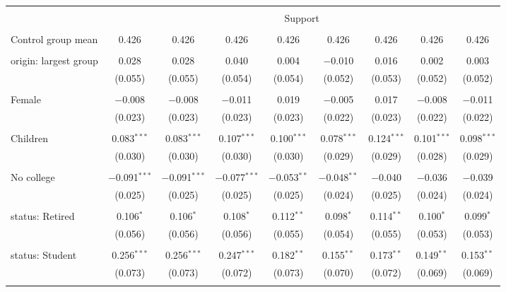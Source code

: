 
\begin{tabular}{@{\extracolsep{5pt}}lcccccccc} 
\\[-1.8ex]\hline 
\hline \\[-1.8ex] 
 & \multicolumn{8}{c}{Support} \\ 
\cline{2-9} 
\hline \\[-1.8ex] 
 Control group mean & 0.426 & 0.426 & 0.426 & 0.426 & 0.426 & 0.426 & 0.426 & 0.426  \\ \hline \\[-1.8ex] origin: largest group & 0.028 & 0.028 & 0.040 & 0.004 & $-$0.010 & 0.016 & 0.002 & 0.003 \\ 
  & (0.055) & (0.055) & (0.054) & (0.054) & (0.052) & (0.053) & (0.052) & (0.052) \\ 
  & & & & & & & & \\ 
 Female & $-$0.008 & $-$0.008 & $-$0.011 & 0.019 & $-$0.005 & 0.017 & $-$0.008 & $-$0.011 \\ 
  & (0.023) & (0.023) & (0.023) & (0.023) & (0.022) & (0.023) & (0.022) & (0.022) \\ 
  & & & & & & & & \\ 
 Children & 0.083$^{***}$ & 0.083$^{***}$ & 0.107$^{***}$ & 0.100$^{***}$ & 0.078$^{***}$ & 0.124$^{***}$ & 0.101$^{***}$ & 0.098$^{***}$ \\ 
  & (0.030) & (0.030) & (0.030) & (0.030) & (0.029) & (0.029) & (0.028) & (0.029) \\ 
  & & & & & & & & \\ 
 No college & $-$0.091$^{***}$ & $-$0.091$^{***}$ & $-$0.077$^{***}$ & $-$0.053$^{**}$ & $-$0.048$^{**}$ & $-$0.040 & $-$0.036 & $-$0.039 \\ 
  & (0.025) & (0.025) & (0.025) & (0.025) & (0.024) & (0.025) & (0.024) & (0.024) \\ 
  & & & & & & & & \\ 
 status: Retired & 0.106$^{*}$ & 0.106$^{*}$ & 0.108$^{*}$ & 0.112$^{**}$ & 0.098$^{*}$ & 0.114$^{**}$ & 0.100$^{*}$ & 0.099$^{*}$ \\ 
  & (0.056) & (0.056) & (0.056) & (0.055) & (0.054) & (0.055) & (0.053) & (0.053) \\ 
  & & & & & & & & \\ 
 status: Student & 0.256$^{***}$ & 0.256$^{***}$ & 0.247$^{***}$ & 0.182$^{**}$ & 0.155$^{**}$ & 0.173$^{**}$ & 0.149$^{**}$ & 0.153$^{**}$ \\ 
  & (0.073) & (0.073) & (0.072) & (0.073) & (0.070) & (0.072) & (0.069) & (0.069) \\ 
  & & & & & & & & \\ 

\end{tabular}
